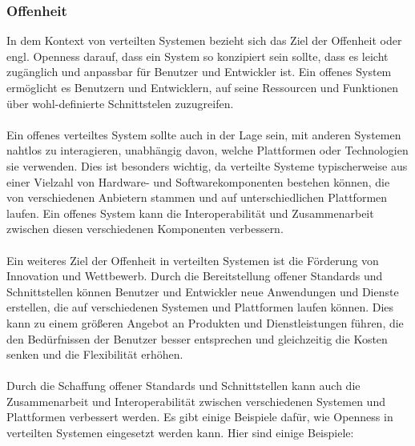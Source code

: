 \subsubsection{Offenheit}
In dem Kontext von verteilten Systemen bezieht sich das Ziel der Offenheit oder engl. Openness darauf, dass ein System so konzipiert sein sollte, dass es leicht zugänglich und anpassbar für Benutzer und Entwickler ist. Ein offenes System ermöglicht es Benutzern und Entwicklern, auf seine Ressourcen und Funktionen über wohl-definierte Schnittstelen zuzugreifen.
\\\\
Ein offenes verteiltes System sollte auch in der Lage sein, mit anderen Systemen nahtlos zu interagieren, unabhängig davon, welche Plattformen oder Technologien sie verwenden. Dies ist besonders wichtig, da verteilte Systeme typischerweise aus einer Vielzahl von Hardware- und Softwarekomponenten bestehen können, die von verschiedenen Anbietern stammen und auf unterschiedlichen Plattformen laufen. Ein offenes System kann die Interoperabilität und Zusammenarbeit zwischen diesen verschiedenen Komponenten verbessern.
\\\\
Ein weiteres Ziel der Offenheit in verteilten Systemen ist die Förderung von Innovation und Wettbewerb. Durch die Bereitstellung offener Standards und Schnittstellen können Benutzer und Entwickler neue Anwendungen und Dienste erstellen, die auf verschiedenen Systemen und Plattformen laufen können. Dies kann zu einem größeren Angebot an Produkten und Dienstleistungen führen, die den Bedürfnissen der Benutzer besser entsprechen und gleichzeitig die Kosten senken und die Flexibilität erhöhen.
\\\\
Durch die Schaffung offener Standards und Schnittstellen kann auch die Zusammenarbeit und Interoperabilität zwischen verschiedenen Systemen und Plattformen verbessert werden. Es gibt einige Beispiele dafür, wie Openness in verteilten Systemen eingesetzt werden kann. Hier sind einige Beispiele:
